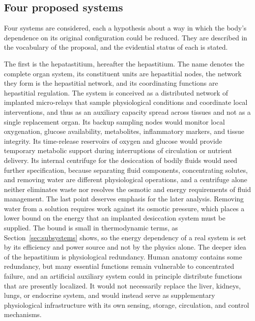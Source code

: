 \documentclass[11pt]{article}
\theoremstyle{plain}
\theoremstyle{definition}
\theoremstyle{remark}
\begin{document}
\subsection{Four proposed systems}

Four systems are considered, each a hypothesis about a way in which the body's dependence on its original configuration could be reduced. They are described in the vocabulary of the proposal, and the evidential status of each is stated.

The first is the hepatastitium, hereafter the hepastitium. The name denotes the complete organ system, its constituent units are hepastitial nodes, the network they form is the hepastitial network, and its coordinating functions are hepastitial regulation. The system is conceived as a distributed network of implanted micro-relays that sample physiological conditions and coordinate local interventions, and thus as an auxiliary capacity spread across tissues and not as a single replacement organ. Its backup sampling nodes would monitor local oxygenation, glucose availability, metabolites, inflammatory markers, and tissue integrity. Its time-release reservoirs of oxygen and glucose would provide temporary metabolic support during interruptions of circulation or nutrient delivery. Its internal centrifuge for the desiccation of bodily fluids would need further specification, because separating fluid components, concentrating solutes, and removing water are different physiological operations, and a centrifuge alone neither eliminates waste nor resolves the osmotic and energy requirements of fluid management. The last point deserves emphasis for the later analysis. Removing water from a solution requires work against its osmotic pressure, which places a lower bound on the energy that an implanted desiccation system must be supplied. The bound is small in thermodynamic terms, as Section~\ref{sec:subsystems} shows, so the energy dependency of a real system is set by its efficiency and power source and not by the physics alone. The deeper idea of the hepastitium is physiological redundancy. Human anatomy contains some redundancy, but many essential functions remain vulnerable to concentrated failure, and an artificial auxiliary system could in principle distribute functions that are presently localized. It would not necessarily replace the liver, kidneys, lungs, or endocrine system, and would instead serve as supplementary physiological infrastructure with its own sensing, storage, circulation, and control mechanisms.
\end{document}
